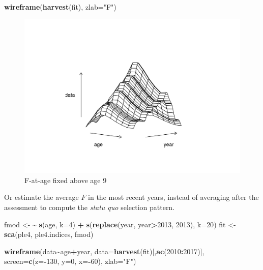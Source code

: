 \documentclass[
]{book}
\newenvironment{Shaded}{\begin{snugshade}}{\end{snugshade}}
\newcommand{\AttributeTok}[1]{\textcolor[rgb]{0.13,0.29,0.53}{#1}}
\newcommand{\DecValTok}[1]{\textcolor[rgb]{0.00,0.00,0.81}{#1}}
\newcommand{\ErrorTok}[1]{\textcolor[rgb]{0.64,0.00,0.00}{\textbf{#1}}}
\newcommand{\FunctionTok}[1]{\textcolor[rgb]{0.13,0.29,0.53}{\textbf{#1}}}
\newcommand{\NormalTok}[1]{#1}
\newcommand{\OtherTok}[1]{\textcolor[rgb]{0.56,0.35,0.01}{#1}}
\newcommand{\SpecialCharTok}[1]{\textcolor[rgb]{0.81,0.36,0.00}{\textbf{#1}}}
\newcommand{\StringTok}[1]{\textcolor[rgb]{0.31,0.60,0.02}{#1}}
\begin{document}
\begin{Shaded}
\begin{Highlighting}[]
\FunctionTok{wireframe}\NormalTok{(}\FunctionTok{harvest}\NormalTok{(fit), }\AttributeTok{zlab=}\StringTok{"F"}\NormalTok{)}
\end{Highlighting}
\end{Shaded}

\begin{figure}
\centering
\includegraphics{_bookdown_files/_main_files/figure-html/ctsselage-1.png}
\caption{\label{fig:ctsselage}F-at-age fixed above age 9}
\end{figure}

Or estimate the average \(F\) in the most recent years, instead of averaging after the assessment to compute the \emph{statu quo} selection pattern.

\begin{Shaded}
\begin{Highlighting}[]
\NormalTok{fmod }\OtherTok{\textless{}{-}} \ErrorTok{\textasciitilde{}} \FunctionTok{s}\NormalTok{(age, }\AttributeTok{k=}\DecValTok{4}\NormalTok{) }\SpecialCharTok{+} \FunctionTok{s}\NormalTok{(}\FunctionTok{replace}\NormalTok{(year, year}\SpecialCharTok{\textgreater{}}\DecValTok{2013}\NormalTok{, }\DecValTok{2013}\NormalTok{), }\AttributeTok{k=}\DecValTok{20}\NormalTok{)}
\NormalTok{fit }\OtherTok{\textless{}{-}} \FunctionTok{sca}\NormalTok{(ple4, ple4.indices, fmod)}
\end{Highlighting}
\end{Shaded}

\begin{Shaded}
\begin{Highlighting}[]
\FunctionTok{wireframe}\NormalTok{(data}\SpecialCharTok{\textasciitilde{}}\NormalTok{age}\SpecialCharTok{+}\NormalTok{year, }\AttributeTok{data=}\FunctionTok{harvest}\NormalTok{(fit)[,}\FunctionTok{ac}\NormalTok{(}\DecValTok{2010}\SpecialCharTok{:}\DecValTok{2017}\NormalTok{)], }\AttributeTok{screen=}\FunctionTok{c}\NormalTok{(}\AttributeTok{z=}\SpecialCharTok{{-}}\DecValTok{130}\NormalTok{, }\AttributeTok{y=}\DecValTok{0}\NormalTok{, }\AttributeTok{x=}\SpecialCharTok{{-}}\DecValTok{60}\NormalTok{), }\AttributeTok{zlab=}\StringTok{"F"}\NormalTok{)}
\end{Highlighting}
\end{Shaded}
\end{document}
